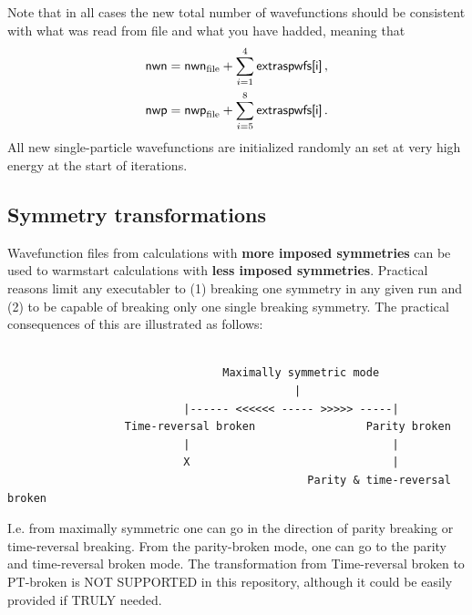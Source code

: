 \documentclass[print,amsmath,amssymb,aps,prc,nofootinbib,notitlepage]{revtex4-1}
\begin{document}
  Note that in all cases the new total number of wavefunctions should be consistent with what
  was read from file and what you have hadded, meaning that 
 \begin{align}
  \textsf{nwn} = \textsf{nwn}_{\rm file} + \sum_{i=1}^4 \textsf{extraspwfs[i]} \, , \\
  \textsf{nwp} = \textsf{nwp}_{\rm file} + \sum_{i=5}^8 \textsf{extraspwfs[i]} \, .
 \end{align}
 All new single-particle wavefunctions are initialized randomly an set at very high
 energy at the start of iterations.

 
\subsection{Symmetry transformations}

Wavefunction files from calculations with \textbf{more imposed symmetries} can
be used to warmstart calculations with \textbf{less imposed symmetries}. 
Practical reasons limit any executabler to (1) breaking one symmetry in any
given run and (2) to be capable of breaking only one single breaking symmetry. 
The practical consequences of this are illustrated as follows:

\begin{Verbatim}

                                 Maximally symmetric mode
                                            | 
                           |------ <<<<<< ----- >>>>> -----|
                  Time-reversal broken                 Parity broken
                           |                               |
                           X                               |
                                              Parity & time-reversal broken

\end{Verbatim}
%
I.e. from maximally symmetric one can go in the direction of parity breaking 
or time-reversal breaking. From the parity-broken mode, one can go to the 
parity and time-reversal broken mode. The transformation from Time-reversal
broken to PT-broken is NOT SUPPORTED in this repository, although it could be 
easily provided if TRULY needed. 
\end{document}
